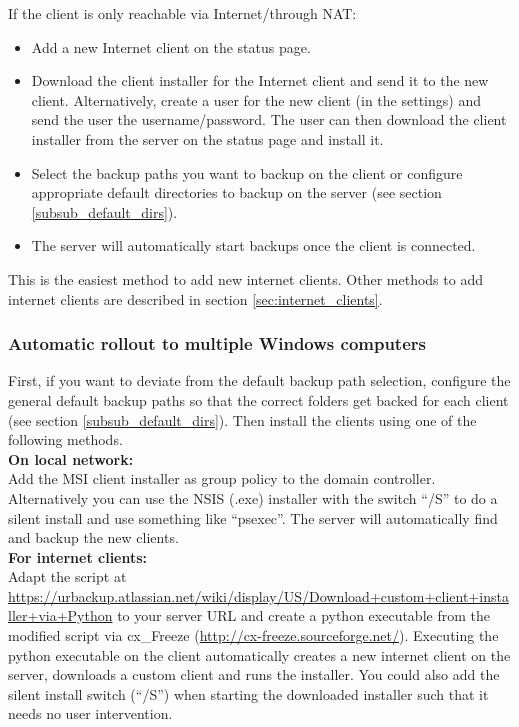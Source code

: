 \documentclass[a4paper,10pt]{article}
\begin{document}
\noindent If the client is only reachable via Internet/through NAT:

\begin{itemize}
  \item Add a new Internet client on the status page.
  \item Download the client installer for the Internet client and send it to the new client. Alternatively, create a user for the new client (in the settings) and send the user the username/password. The user can then download the client installer from the server on the status page and install it.
  \item Select the backup paths you want to backup on the client or configure appropriate default directories to backup on the server (see section \ref{subsub_default_dirs}).
  \item The server will automatically start backups once the client is connected.
\end{itemize}

\noindent This is the easiest method to add new internet clients. Other methods to add internet clients are described in section \ref{sec:internet_clients}.

\subsubsection{Automatic rollout to multiple Windows computers}

First, if you want to deviate from the default backup path selection, configure the general default backup paths so that the correct folders get backed for each client (see section \ref{subsub_default_dirs}). Then install the clients using one of the following methods.\\ 

\noindent \textbf{On local network:}\\

\noindent Add the MSI client installer as group policy to the domain controller. Alternatively you can use the NSIS (.exe) installer with the switch ``/S'' to do a silent install and use something like ``psexec''. The server will automatically find and backup the new clients.\\

\noindent \textbf{For internet clients:}\\

\noindent Adapt the script at \url{https://urbackup.atlassian.net/wiki/display/US/Download+custom+client+installer+via+Python} to your server URL and create a python executable from the modified script via cx\_Freeze (\url{http://cx-freeze.sourceforge.net/}). Executing the python executable on the client automatically creates a new internet client on the server, downloads a custom client and runs the installer. You could also add the silent install switch (``/S'') when starting the downloaded installer such that it needs no user intervention.
\end{document}
